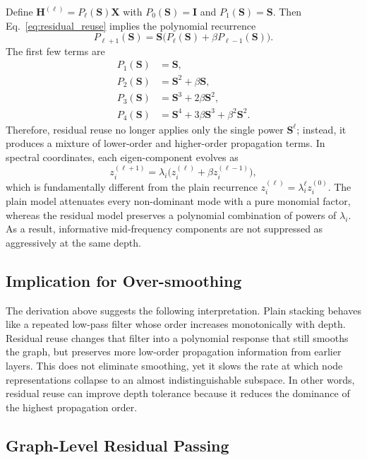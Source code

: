 Define $\mathbf{H}^{(\ell)} = P_{\ell}(\mathbf{S})\mathbf{X}$ with $P_0(\mathbf{S})=\mathbf{I}$ and $P_1(\mathbf{S})=\mathbf{S}$. Then Eq.~\eqref{eq:residual_reuse} implies the polynomial recurrence
\begin{equation}
P_{\ell+1}(\mathbf{S}) = \mathbf{S}\bigl(P_{\ell}(\mathbf{S}) + \beta P_{\ell-1}(\mathbf{S})\bigr).
\end{equation}
The first few terms are
\begin{align}
P_1(\mathbf{S}) &= \mathbf{S}, \\
P_2(\mathbf{S}) &= \mathbf{S}^2 + \beta \mathbf{S}, \\
P_3(\mathbf{S}) &= \mathbf{S}^3 + 2\beta \mathbf{S}^2, \\
P_4(\mathbf{S}) &= \mathbf{S}^4 + 3\beta \mathbf{S}^3 + \beta^2 \mathbf{S}^2.
\end{align}
Therefore, residual reuse no longer applies only the single power $\mathbf{S}^{\ell}$; instead, it produces a mixture of lower-order and higher-order propagation terms. In spectral coordinates, each eigen-component evolves as
\begin{equation}
z_i^{(\ell+1)} = \lambda_i\bigl(z_i^{(\ell)} + \beta z_i^{(\ell-1)}\bigr),
\end{equation}
which is fundamentally different from the plain recurrence $z_i^{(\ell)}=\lambda_i^{\ell}z_i^{(0)}$. The plain model attenuates every non-dominant mode with a pure monomial factor, whereas the residual model preserves a polynomial combination of powers of $\lambda_i$. As a result, informative mid-frequency components are not suppressed as aggressively at the same depth.

\subsection{Implication for Over-smoothing}

The derivation above suggests the following interpretation. Plain stacking behaves like a repeated low-pass filter whose order increases monotonically with depth. Residual reuse changes that filter into a polynomial response that still smooths the graph, but preserves more low-order propagation information from earlier layers. This does not eliminate smoothing, yet it slows the rate at which node representations collapse to an almost indistinguishable subspace. In other words, residual reuse can improve depth tolerance because it reduces the dominance of the highest propagation order.

\subsection{Graph-Level Residual Passing}

